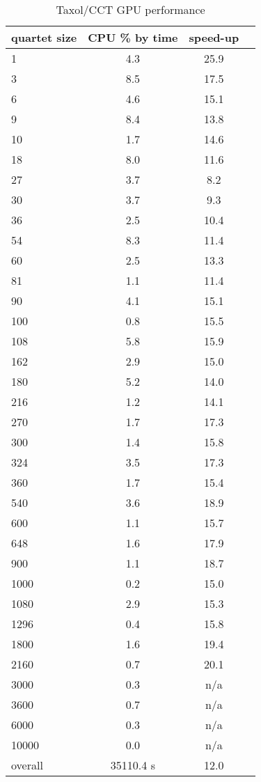 \documentclass[12pt]{article}
\begin{document}
\begin{table}
  \label{results2}
  \caption {Taxol/CCT GPU performance}
  \begin{center}
    \begin{tabular}{| l | c | c | c |}
      \hline
      quartet size & CPU \% by time  &  speed-up \\
      \hline
      1 & 4.3 & 25.9 \\
      3 & 8.5 & 17.5 \\
      6 & 4.6 & 15.1 \\
      9 & 8.4 & 13.8 \\
      10 & 1.7 & 14.6 \\
      18 & 8.0 & 11.6 \\
      27 & 3.7 & 8.2 \\
      30 & 3.7 & 9.3 \\
      36 & 2.5 & 10.4 \\
      54 & 8.3 & 11.4 \\
      60 & 2.5 & 13.3 \\
      81 & 1.1 & 11.4 \\
      90 & 4.1 & 15.1 \\
      100 & 0.8 & 15.5 \\
      108 & 5.8 & 15.9 \\
      162 & 2.9 & 15.0 \\
      180 & 5.2 & 14.0 \\
      216 & 1.2 & 14.1 \\
      270 & 1.7 & 17.3 \\
      300 & 1.4 & 15.8 \\
      324 & 3.5 & 17.3 \\
      360 & 1.7 & 15.4 \\
      540 & 3.6 & 18.9 \\
      600 & 1.1 & 15.7 \\
      648 & 1.6 & 17.9 \\
      900 & 1.1 & 18.7 \\
      1000 & 0.2 & 15.0 \\
      1080 & 2.9 & 15.3 \\
      1296 & 0.4 & 15.8 \\
      1800 & 1.6 & 19.4 \\
      2160 & 0.7 & 20.1 \\
      3000 & 0.3 & n/a \\
      3600 & 0.7 & n/a \\
      6000 & 0.3 & n/a \\
      10000 & 0.0 & n/a \\
      \hline
      overall & 35110.4 s &  12.0 
    \end{tabular}
  \end{center}
\end{table}
  
\end{document}
